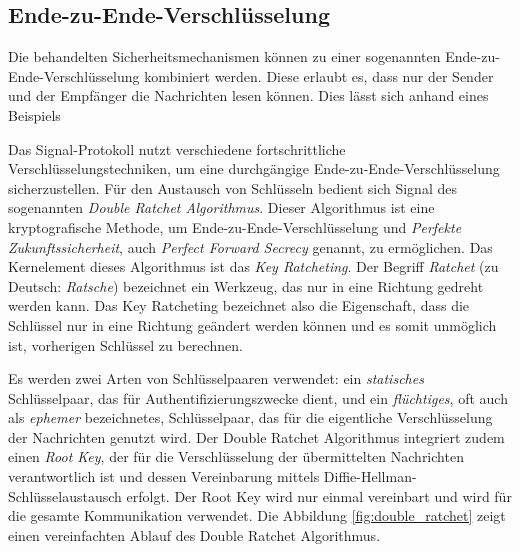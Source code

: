 \subsection{Ende-zu-Ende-Verschlüsselung}
\label{subsec:signal_protokoll_basics}


Die behandelten Sicherheitsmechanismen können zu einer sogenannten Ende-zu-Ende-Verschlüsselung kombiniert werden. Diese erlaubt es, dass nur der Sender und der Empfänger die Nachrichten lesen können. Dies lässt sich anhand eines Beispiels 

Das Signal-Protokoll nutzt verschiedene fortschrittliche Verschlüsselungstechniken, um eine durchgängige Ende-zu-Ende-Verschlüsselung sicherzustellen. Für den Austausch von Schlüsseln bedient sich Signal des sogenannten \textit{Double Ratchet Algorithmus}. Dieser Algorithmus ist eine kryptografische Methode, um Ende-zu-Ende-Verschlüsselung und \textit{Perfekte Zukunftssicherheit}, auch \textit{Perfect Forward Secrecy} genannt, zu ermöglichen. Das Kernelement dieses Algorithmus ist das \textit{Key Ratcheting}. Der Begriff \textit{Ratchet} (zu Deutsch: \textit{Ratsche}) bezeichnet ein Werkzeug, das nur in eine Richtung gedreht werden kann. Das Key Ratcheting bezeichnet also die Eigenschaft, dass die Schlüssel nur in eine Richtung geändert werden können und es somit unmöglich ist, vorherigen Schlüssel zu berechnen.

Es werden zwei Arten von Schlüsselpaaren verwendet: ein \textit{statisches} Schlüsselpaar, das für Authentifizierungszwecke dient, und ein \textit{flüchtiges}, oft auch als \textit{ephemer} bezeichnetes, Schlüsselpaar, das für die eigentliche Verschlüsselung der Nachrichten genutzt wird. Der Double Ratchet Algorithmus integriert zudem einen \textit{Root Key}, der für die Verschlüsselung der übermittelten Nachrichten verantwortlich ist und dessen Vereinbarung mittels Diffie-Hellman-Schlüsselaustausch erfolgt. Der Root Key wird nur einmal vereinbart und wird für die gesamte Kommunikation verwendet. Die Abbildung \ref{fig:double_ratchet} zeigt einen vereinfachten Ablauf des Double Ratchet Algorithmus.


